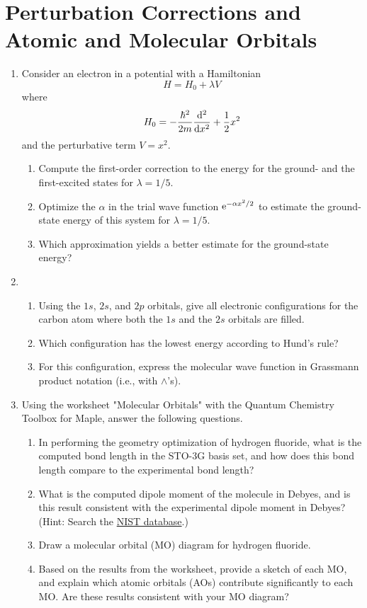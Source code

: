 \documentclass[../psets.tex]{subfiles}
\begin{document}
\section{Perturbation Corrections and Atomic and Molecular Orbitals}
\begin{enumerate}
    \item {}Consider an electron in a potential with a Hamiltonian
    \begin{equation*}
        H = H_0+\lambda V
    \end{equation*}
    where
    \begin{equation*}
        H_0 = -\frac{\hbar^2}{2m}\dv[2]{x}+\frac{1}{2}x^2
    \end{equation*}
    and the perturbative term $V=x^2$.
    \begin{enumerate}
        \item Compute the first-order correction to the energy for the ground- and the first-excited states for $\lambda=1/5$.
        \item Optimize the $\alpha$ in the trial wave function $\e[-\alpha x^2/2]$ to estimate the ground-state energy of this system for $\lambda=1/5$.
        \item Which approximation yields a better estimate for the ground-state energy?
    \end{enumerate}
    \item 
    \begin{enumerate}
        \item Using the $1s$, $2s$, and $2p$ orbitals, give all electronic configurations for the carbon atom where both the $1s$ and the $2s$ orbitals are filled.
        \item Which configuration has the lowest energy according to Hund's rule?
        \item For this configuration, express the molecular wave function in Grassmann product notation (i.e., with $\wedge$'s).
    \end{enumerate}
    \item Using the worksheet "Molecular Orbitals" with the Quantum Chemistry Toolbox for Maple, answer the following questions.
    \begin{enumerate}
        \item In performing the geometry optimization of hydrogen fluoride, what is the computed bond length in the STO-3G basis set, and how does this bond length compare to the experimental bond length?
        \item What is the computed dipole moment of the molecule in Debyes, and is this result consistent with the experimental dipole moment in Debyes? (Hint: Search the \href{https://cccbdb.nist.gov/exp1x.asp}{NIST database}.)
        \item Draw a molecular orbital (MO) diagram for hydrogen fluoride.
        \item Based on the results from the worksheet, provide a sketch of each MO, and explain which atomic orbitals (AOs) contribute significantly to each MO. Are these results consistent with your MO diagram?
    \end{enumerate}
\end{enumerate}
\end{document}
